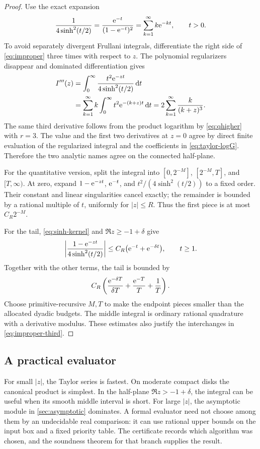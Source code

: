 \begin{proof}
Use the exact expansion
\begin{equation}\label{eq:sinh-kernel}
 \frac{1}{4\sinh^2(t/2)}
 =\frac{\mathrm e^{-t}}{(1-\mathrm e^{-t})^2}
 =\sum_{k=1}^{\infty}k\mathrm e^{-kt},\qquad t>0.
\end{equation}
To avoid separately divergent Frullani integrals, differentiate the right side
of \cref{eq:improper} three times with respect to \(z\).  The polynomial
regularizers disappear and dominated differentiation gives
\begin{align}
 I'''(z)
 &=\int_0^\infty
   \frac{t^2\mathrm e^{-zt}}{4\sinh^2(t/2)}\,\mathrm d t\notag\\
 &=\sum_{k=1}^{\infty}k\int_0^\infty t^2\mathrm e^{-(k+z)t}\,\mathrm d t
 =2\sum_{k=1}^{\infty}\frac{k}{(k+z)^3}.
 \label{eq:improper-third}
\end{align}
The same third derivative follows from the product logarithm by
\cref{eq:qhigher} with \(r=3\).  The value and the first two derivatives at
\(z=0\) agree by direct finite evaluation of the regularized integral and the
coefficients in \cref{eq:taylor-logG}.  Therefore the two analytic names agree
on the connected half-plane.

For the quantitative version, split the integral into
\([0,2^{-M}]\), \([2^{-M},T]\), and \([T,\infty)\).  At zero, expand
\(1-\mathrm e^{-zt}\), \(\mathrm e^{-t}\), and
\(t^2/(4\sinh^2(t/2))\) to a fixed order.  Their constant and linear
singularities cancel exactly; the remainder is bounded by a rational multiple
of \(t\), uniformly for \(|z|\le R\).  Thus the first piece is at most
\(C_R2^{-M}\).

For the tail, \cref{eq:sinh-kernel} and
\(\Re z\ge-1+\delta\) give
\[
 \left|\frac{1-\mathrm e^{-zt}}{4\sinh^2(t/2)}\right|
 \le C_R\bigl(\mathrm e^{-t}+\mathrm e^{-\delta t}\bigr),
 \qquad t\ge1.
\]
Together with the other terms, the tail is bounded by
\[
 C_R\left(\frac{\mathrm e^{-\delta T}}{\delta T}
          +\frac{\mathrm e^{-T}}{T}+\frac1T\right).
\]
Choose primitive-recursive \(M,T\) to make the endpoint pieces smaller than
the allocated dyadic budgets.  The middle integral is ordinary rational
quadrature with a derivative modulus.  These estimates also justify the
interchanges in \cref{eq:improper-third}.
\end{proof}

\subsection{A practical evaluator}

For small \(|z|\), the Taylor series is fastest.  On moderate compact disks the
canonical product is simplest.  In the half-plane \(\Re z>-1+\delta\), the
integral can be useful when its smooth middle interval is short.  For large
\(|z|\), the asymptotic module in \cref{sec:asymptotic} dominates.  A formal
evaluator need not choose among them by an undecidable real comparison: it can
use rational upper bounds on the input box and a fixed priority table.  The
certificate records which algorithm was chosen, and the soundness theorem for
that branch supplies the result.

